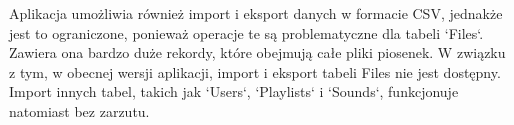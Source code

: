 Aplikacja umożliwia również import i eksport danych w formacie CSV, jednakże jest to ograniczone, ponieważ operacje te są problematyczne dla tabeli `Files`. Zawiera ona bardzo duże rekordy, które obejmują całe pliki piosenek. W związku z tym, w obecnej wersji aplikacji, import i eksport tabeli Files nie jest dostępny. Import innych tabel, takich jak `Users`, `Playlists` i `Sounds`, funkcjonuje natomiast bez zarzutu.



